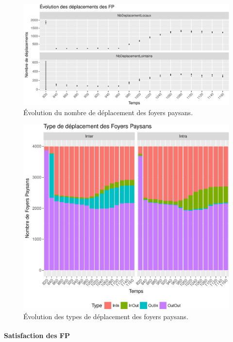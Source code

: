 \begin{figure}[H]
	\captionsetup{width=\linewidth}
	\includegraphics[width=\linewidth]{img/resultats/v0_nombre_deplacements.pdf}
	\caption{Évolution du nombre de déplacement des foyers paysans.} 
	\label{fig:nb-deplacements-v0} 
\end{figure}

\begin{figure}[H]
	\captionsetup{width=\linewidth}
	\includegraphics[width=\linewidth]{img/resultats/v0_types_deplacements.pdf}
	\caption{Évolution des types de déplacement des foyers paysans.} 
	\label{fig:type-deplacements-v0} 
\end{figure}

\paragraph{Satisfaction des FP}

